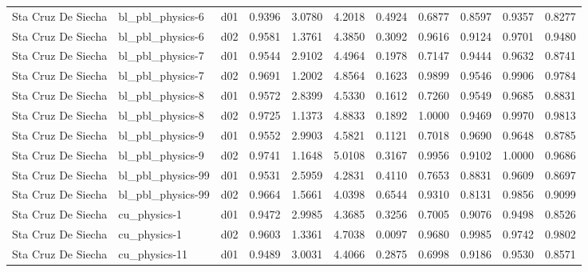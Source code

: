 \begin{longtable}{lllrrrrrrrr}
   Sta Cruz De Siecha  &      bl\_pbl\_physics-6 &     d01 &   0.9396 &   3.0780 &   4.2018 &       0.4924 &        0.6877 &       0.8597 &           0.9357 &  0.8277 \\
   Sta Cruz De Siecha  &      bl\_pbl\_physics-6 &     d02 &   0.9581 &   1.3761 &   4.3850 &       0.3092 &        0.9616 &       0.9124 &           0.9701 &  0.9480 \\
   Sta Cruz De Siecha  &      bl\_pbl\_physics-7 &     d01 &   0.9544 &   2.9102 &   4.4964 &       0.1978 &        0.7147 &       0.9444 &           0.9632 &  0.8741 \\
   Sta Cruz De Siecha  &      bl\_pbl\_physics-7 &     d02 &   0.9691 &   1.2002 &   4.8564 &       0.1623 &        0.9899 &       0.9546 &           0.9906 &  0.9784 \\
   Sta Cruz De Siecha  &      bl\_pbl\_physics-8 &     d01 &   0.9572 &   2.8399 &   4.5330 &       0.1612 &        0.7260 &       0.9549 &           0.9685 &  0.8831 \\
   Sta Cruz De Siecha  &      bl\_pbl\_physics-8 &     d02 &   0.9725 &   1.1373 &   4.8833 &       0.1892 &        1.0000 &       0.9469 &           0.9970 &  0.9813 \\
   Sta Cruz De Siecha  &      bl\_pbl\_physics-9 &     d01 &   0.9552 &   2.9903 &   4.5821 &       0.1121 &        0.7018 &       0.9690 &           0.9648 &  0.8785 \\
   Sta Cruz De Siecha  &      bl\_pbl\_physics-9 &     d02 &   0.9741 &   1.1648 &   5.0108 &       0.3167 &        0.9956 &       0.9102 &           1.0000 &  0.9686 \\
   Sta Cruz De Siecha  &     bl\_pbl\_physics-99 &     d01 &   0.9531 &   2.5959 &   4.2831 &       0.4110 &        0.7653 &       0.8831 &           0.9609 &  0.8697 \\
   Sta Cruz De Siecha  &     bl\_pbl\_physics-99 &     d02 &   0.9664 &   1.5661 &   4.0398 &       0.6544 &        0.9310 &       0.8131 &           0.9856 &  0.9099 \\
   Sta Cruz De Siecha  &          cu\_physics-1 &     d01 &   0.9472 &   2.9985 &   4.3685 &       0.3256 &        0.7005 &       0.9076 &           0.9498 &  0.8526 \\
   Sta Cruz De Siecha  &          cu\_physics-1 &     d02 &   0.9603 &   1.3361 &   4.7038 &       0.0097 &        0.9680 &       0.9985 &           0.9742 &  0.9802 \\
   Sta Cruz De Siecha  &         cu\_physics-11 &     d01 &   0.9489 &   3.0031 &   4.4066 &       0.2875 &        0.6998 &       0.9186 &           0.9530 &  0.8571 \\

\end{longtable}
